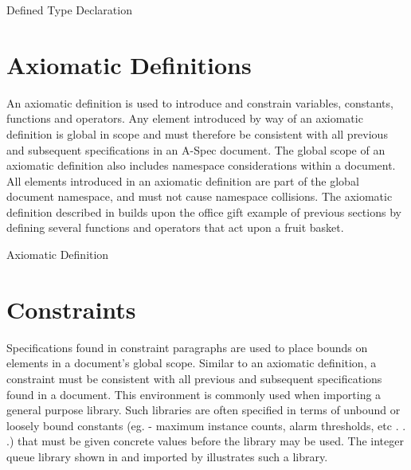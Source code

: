 \documentclass[letterpaper,10pt,draft]{book}
\begin{document}
\begin{example}
\begin{minipage}[t]{0.49\linewidth}
   
\end{minipage}
\begin{minipage}[t]{0.49\linewidth}
   \azed
   
\end{minipage}

   \caption{Defined Type Declaration}
   \label{ex:TypeDecl}
\end{example}

\section{Axiomatic Definitions}
   \label{sect:AxDef}

An axiomatic definition is used to introduce and constrain variables, constants,
functions and operators.  Any element introduced by way of an axiomatic definition
is global in scope and must therefore be consistent with all previous and subsequent
specifications in an A-Spec document.  The global scope of an axiomatic definition
also includes namespace considerations within a document.  All elements introduced
in an axiomatic definition are part of the global document namespace, and must not
cause namespace collisions.  The axiomatic definition described in 
builds upon the office gift example of previous sections by defining several functions
and operators that act upon a fruit basket.

\begin{example}
\begin{minipage}[t]{0.49\linewidth}
   
\end{minipage}
\begin{minipage}[t]{0.49\linewidth}
   \azbox
   
\end{minipage}

   \caption{Axiomatic Definition}
   \label{ex:AxDef}
\end{example}

\section{Constraints}
   \label{sect:Const}

Specifications found in constraint paragraphs are used to place bounds on elements
in a document's global scope.  Similar to an axiomatic definition, a constraint
must be consistent with all previous and subsequent specifications found in a document.
This environment is commonly used when importing a general purpose library.  Such
libraries are often specified in terms of unbound or loosely bound constants
(eg. - maximum instance counts, alarm thresholds, etc . . .) that must be given
concrete values before the library may be used.  The integer queue library shown
in  and imported by  illustrates such a library.
\end{document}
